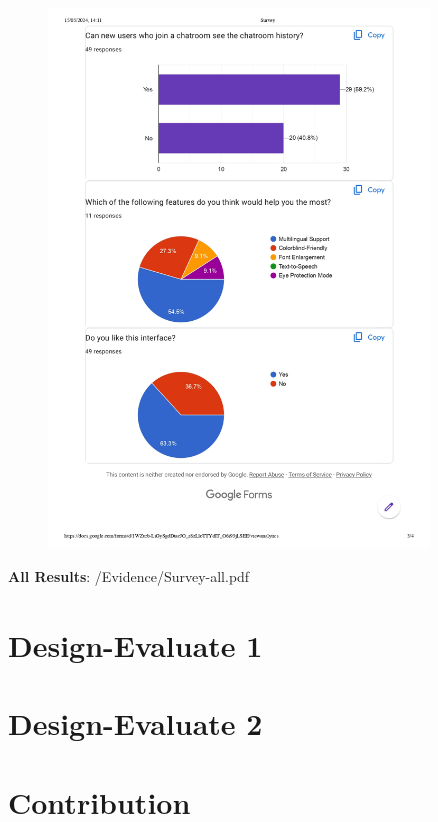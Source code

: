 \documentclass[12pt]{article}
\begin{document}
        \begin{figure}[H]
            \centering
            \includegraphics[width=0.9\textwidth]{graphs/Survey-summary_page-0003.jpg}
        \end{figure}

        \textbf{All Results}: /Evidence/Survey-all.pdf


\section{Design-Evaluate 1}



\section{Design-Evaluate 2}


\section{Contribution}


 
\end{document}
